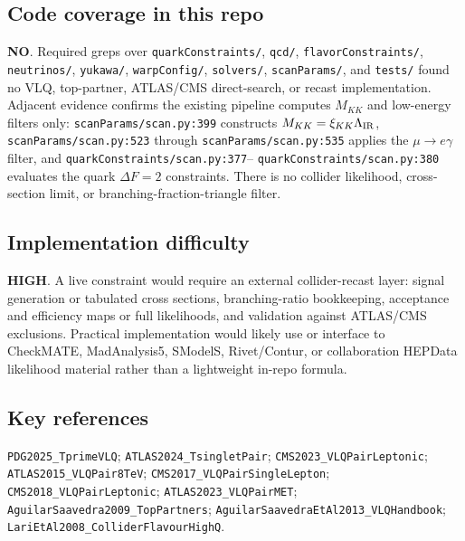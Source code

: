 \subsection*{Code coverage in this repo}
\textbf{NO}.  Required greps over \texttt{quarkConstraints/}, \texttt{qcd/},
\texttt{flavorConstraints/}, \texttt{neutrinos/}, \texttt{yukawa/},
\texttt{warpConfig/}, \texttt{solvers/}, \texttt{scanParams/}, and
\texttt{tests/} found no VLQ, top-partner, ATLAS/CMS direct-search, or recast
implementation.  Adjacent evidence confirms the existing pipeline computes
\(M_{KK}\) and low-energy filters only: \texttt{scanParams/scan.py:399}
constructs \(M_{KK}=\xi_{KK}\Lambda_{\rm IR}\),
\texttt{scanParams/scan.py:523} through \texttt{scanParams/scan.py:535} applies the
\(\mu\to e\gamma\) filter, and \texttt{quarkConstraints/scan.py:377}--
\texttt{quarkConstraints/scan.py:380} evaluates the quark \(\Delta F=2\)
constraints.  There is no collider likelihood, cross-section limit, or
branching-fraction-triangle filter.

\subsection*{Implementation difficulty}
\textbf{HIGH}.  A live constraint would require an external collider-recast
layer: signal generation or tabulated cross sections, branching-ratio
bookkeeping, acceptance and efficiency maps or full likelihoods, and validation
against ATLAS/CMS exclusions.  Practical implementation would likely use or
interface to CheckMATE, MadAnalysis5, SModelS, Rivet/Contur, or collaboration
HEPData likelihood material rather than a lightweight in-repo formula.

\subsection*{Key references}
\texttt{PDG2025\_TprimeVLQ}; \texttt{ATLAS2024\_TsingletPair};
\texttt{CMS2023\_VLQPairLeptonic}; \texttt{ATLAS2015\_VLQPair8TeV};
\texttt{CMS2017\_VLQPairSingleLepton}; \texttt{CMS2018\_VLQPairLeptonic};
\texttt{ATLAS2023\_VLQPairMET}; \texttt{AguilarSaavedra2009\_TopPartners};
\texttt{AguilarSaavedraEtAl2013\_VLQHandbook};
\texttt{LariEtAl2008\_ColliderFlavourHighQ}.

